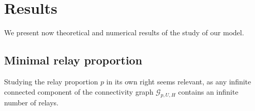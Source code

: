 \documentclass[conference]{IEEEtran}
\begin{document}

\section{Results}
\label{s.Results}
We present now theoretical and numerical results of the study of our model.

\subsection{Minimal relay proportion}
\label{relay-influence}
Studying the relay proportion $p$ in its own right seems relevant, as any infinite connected component of the connectivity graph $\mathcal{G}_{p,U,H}$ contains an infinite number of relays. \\
\end{document}
